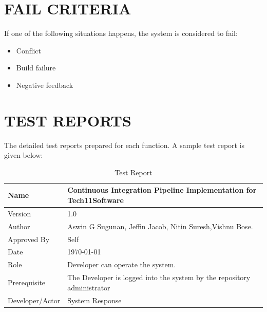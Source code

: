 \documentclass[12pt,a4paper,oneside]{report}
\begin{document}
{\section{FAIL CRITERIA}
\par If one of the following situations happens, the system is considered to fail:
\begin{itemize}
\item	Conflict
\item   Build failure
\item	Negative feedback
\end{itemize}
\pagebreak
\section{TEST REPORTS}
The detailed test reports prepared for each function. A sample test report is given below:
\begin{table}[!htb]
\centering
\caption{Test Report}
\label{Test Report}
\begin{tabular}{|l|l|}
\hline
Name                                                                                & Continuous Integration Pipeline Implementation for Tech11Software                                               \\ \hline
Version                                                                             & 1.0                                                                  \\ \hline
Author                                                                              & Aswin G Sugunan, Jeffin Jacob, Nitin Suresh,Vishnu Bose.              \\ \hline
Approved By                                                                         & Self                                                                 \\ \hline
Date                                                                                & \today                                            \\ \hline
Role                                                                                & Developer can operate the system.                                          \\ \hline
Prerequisite                                                                        & The Developer is logged into the system by the repository administrator                                   \\ \hline
Developer/Actor                                                                          & System Response                                                      \\ \hline

\end{tabular}
\end{table}}
\end{document}
